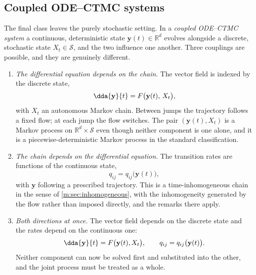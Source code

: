 \subsection{Coupled ODE--CTMC systems}
\label{m:sec:coupled}

The final class leaves the purely stochastic setting. In a \emph{coupled
ODE--CTMC system} a continuous, deterministic state $\mathbf y(t)\in\mathbb R^d$
evolves alongside a discrete, stochastic state $X_t\in\mathcal S$, and the two
influence one another. Three couplings are possible, and they are genuinely
different.

\begin{enumerate}[label=(\roman*),leftmargin=*]
\item \emph{The differential equation depends on the chain.} The vector field is
      indexed by the discrete state,
      \begin{equation}
      \label{m:eq:coupledone}
      \dda{\mathbf y}{t} = F\bigl(\mathbf y(t),\,X_t\bigr),
      \end{equation}
      with $X_t$ an autonomous Markov chain. Between jumps the trajectory follows a
      fixed flow; at each jump the flow switches. The pair
      $(\mathbf y(t),X_t)$ is a Markov process on $\mathbb R^d\times\mathcal S$ even
      though neither component is one alone, and it is a piecewise-deterministic
      Markov process in the standard classification.
\item \emph{The chain depends on the differential equation.} The transition rates
      are functions of the continuous state,
      \begin{equation}
      \label{m:eq:coupledtwo}
      q_{ij} = q_{ij}\bigl(\mathbf y(t)\bigr),
      \end{equation}
      with $\mathbf y$ following a prescribed trajectory. This is a
      time-inhomogeneous chain in the sense of \cref{m:sec:inhomogeneous}, with the
      inhomogeneity generated by the flow rather than imposed directly, and the
      remarks there apply.
\item \emph{Both directions at once.} The vector field depends on the discrete
      state and the rates depend on the continuous one:
      \begin{equation}
      \label{m:eq:coupledthree}
      \dda{\mathbf y}{t} = F\bigl(\mathbf y(t),X_t\bigr),
      \qquad
      q_{ij} = q_{ij}\bigl(\mathbf y(t)\bigr) .
      \end{equation}
      Neither component can now be solved first and substituted into the other, and
      the joint process must be treated as a whole.
\end{enumerate}

